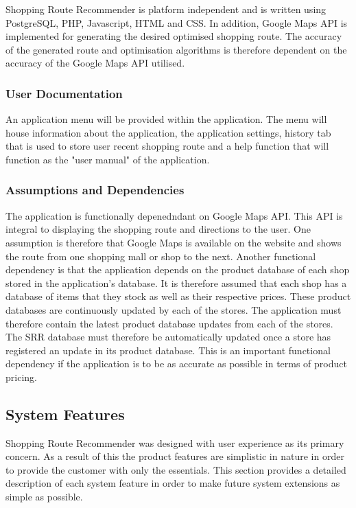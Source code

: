 \documentclass[10pt,twocolumn]{witseiepaper}
\begin{document}
			Shopping Route Recommender is platform independent and is written using PostgreSQL, PHP, Javascript, HTML and CSS. In addition, Google Maps API is implemented for generating the desired optimised shopping route. The accuracy of the generated route and optimisation algorithms is therefore dependent on the accuracy of the Google Maps API utilised. 
		
		\subsubsection{User Documentation}
		
			An application menu will be provided within the application. The menu will house information about the application, the application settings, history tab that is used to store user recent shopping route and a help function that will function as the "user manual" of the application. 
		
		\subsubsection{Assumptions and Dependencies}
		
			The application is functionally depenedndant on Google Maps API. This API is integral to displaying the shopping route and directions to the user. One assumption is therefore that Google Maps is available on the website and shows the route from one shopping mall or shop to the next. Another functional dependency is that the application depends on the product database of each shop stored in the application's database. It is therefore assumed that each shop has a database of items that they stock as well as their respective prices. These product databases are continuously updated by each of the stores. The application must therefore contain the latest product database updates from each of the stores. The SRR database must therefore be automatically updated once a store has registered an update in its product database. This is an important functional dependency if the application is to be as accurate as possible in terms of product pricing. 
		
	\subsection{System Features}
		
		Shopping Route Recommender was designed with user experience as its primary concern. As a result of this the product features are simplistic in nature in order to provide the customer with only the essentials.	This section provides a detailed description of each system feature in order to make future system extensions as simple as possible. 
		
\end{document}
